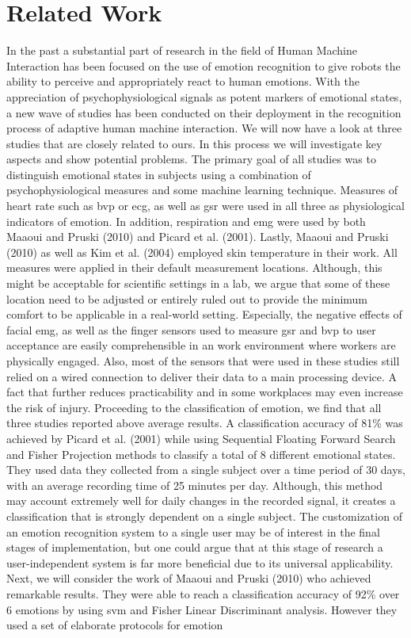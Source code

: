 
\section{Related Work}\label{relwo}
In the past a substantial part of research in the field of Human Machine Interaction has been focused on the use of emotion recognition to give robots the ability to perceive and appropriately react to human emotions. With the appreciation of psychophysiological signals as potent markers of emotional states, a new wave of studies has been conducted on their deployment in the recognition process of adaptive human machine interaction.
We will now have a look at three studies that are closely related to ours. In this process we will investigate key aspects and show potential problems. The primary goal of all studies was to distinguish emotional states in subjects using a combination of psychophysiological measures and some machine learning technique. Measures of heart rate such as \gls{bvp} or \gls{ecg}, as well as \gls{gsr} were used in all three as physiological indicators of emotion. In addition, respiration and \gls{emg} were used by both Maaoui and Pruski (2010) and Picard et al. (2001). Lastly, Maaoui and Pruski (2010) as well as Kim et al. (2004) employed skin temperature in their work. All measures were applied in their default measurement locations. Although, this might be acceptable for scientific settings in a lab, we argue that some of these location need to be adjusted or entirely ruled out to provide the minimum comfort to be applicable in a real-world setting. Especially, the negative effects of facial \gls{emg}, as well as the finger sensors used to measure \gls{gsr} and \gls{bvp} to user acceptance are easily comprehensible in an work environment where workers are physically engaged. Also, most of the sensors that were used in these studies still relied on a wired connection to deliver their data to a main processing device. A fact that further reduces practicability and in some workplaces may even increase the risk of injury.
Proceeding to the classification of emotion, we find that all three studies reported above average results. A classification accuracy of 81\% was achieved by Picard et al. (2001) while using Sequential Floating Forward Search and Fisher Projection methods to classify a total of 8 different emotional states. They used data they collected from a single subject over a time period of 30 days, with an average recording time of 25 minutes per day. Although, this method may account extremely well for daily changes in the recorded signal, it creates a  classification that is strongly dependent on a single subject. The customization of an emotion recognition system to a single user may be of interest in the final stages of implementation, but one could argue that at this stage of research a user-independent system is far more beneficial due to its universal applicability. Next, we will consider the work of Maaoui and Pruski (2010) who achieved remarkable results. They were able to reach a classification accuracy of 92\% over 6 emotions by using \gls{svm} and Fisher Linear Discriminant analysis. However they used a set of elaborate protocols for emotion

